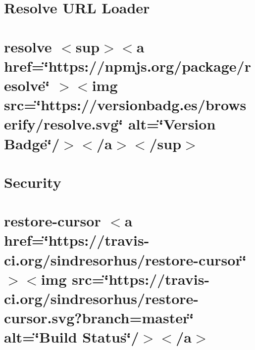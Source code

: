 \documentclass[twoside]{book}
\newcommand{\+}{\discretionary{\mbox{\scriptsize$\hookleftarrow$}}{}{}}
\begin{document}
\chapter{Resolve URL Loader}
\label{md__c___users_vaishnavi_jadhav__desktop__developer_code_mean_stack_example_client_node_modules_resolve_url_loader__r_e_a_d_m_e}

\chapter{resolve \texorpdfstring{$<$}{<}sup\texorpdfstring{$>$}{>}\texorpdfstring{$<$}{<}a href=\char`\"{}https\+://npmjs.\+org/package/resolve\char`\"{} \texorpdfstring{$>$}{>}\texorpdfstring{$<$}{<}img src=\char`\"{}https\+://versionbadg.\+es/browserify/resolve.\+svg\char`\"{} alt=\char`\"{}\+Version Badge\char`\"{}/\texorpdfstring{$>$}{>}\texorpdfstring{$<$}{<}/a\texorpdfstring{$>$}{>}\texorpdfstring{$<$}{<}/sup\texorpdfstring{$>$}{>}}
\label{md__c___users_vaishnavi_jadhav__desktop__developer_code_mean_stack_example_client_node_modules_resolve_readme}

\chapter{Security}
\label{md__c___users_vaishnavi_jadhav__desktop__developer_code_mean_stack_example_client_node_modules_resolve__s_e_c_u_r_i_t_y}

\chapter{restore-\/cursor \texorpdfstring{$<$}{<}a href=\char`\"{}https\+://travis-\/ci.\+org/sindresorhus/restore-\/cursor\char`\"{} \texorpdfstring{$>$}{>}\texorpdfstring{$<$}{<}img src=\char`\"{}https\+://travis-\/ci.\+org/sindresorhus/restore-\/cursor.\+svg?branch=master\char`\"{} alt=\char`\"{}\+Build Status\char`\"{}/\texorpdfstring{$>$}{>}\texorpdfstring{$<$}{<}/a\texorpdfstring{$>$}{>}}
\label{md__c___users_vaishnavi_jadhav__desktop__developer_code_mean_stack_example_client_node_modules_restore_cursor_readme}

\end{document}
